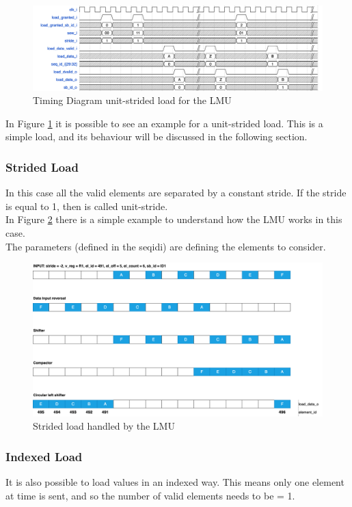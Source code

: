 \begin{figure}[H]
    \centering
    \includegraphics[scale = 0.35]{Chapter_2/img/lmu-time.png}
    \caption{Timing Diagram unit-strided load for the LMU}
    \label{lmu-time}
\end{figure}

In Figure \ref{lmu-time} it is possible to see an example for a unit-strided load. This is a simple load, and its behaviour will be discussed in the following section.

\subsubsection{Strided Load}
In this case all the valid elements are separated by a constant stride. If the stride is equal to 1, then is called unit-stride.\\

In Figure \ref{lmu-strided} there is a simple example to understand how the LMU works in this case.\\
The parameters (defined in the seq\+id\+i) are defining the elements to consider.
\begin{figure}[H]
    \centering
    \includegraphics[scale = 0.25]{Chapter_2/img/lmu-strided.png}
    \caption{Strided load handled by the LMU}
    \label{lmu-strided}
\end{figure}

\subsubsection{Indexed Load}
It is also possible to load values in an indexed way. This means only one element at time is sent, and so the number of valid elements needs to be = 1.\\

